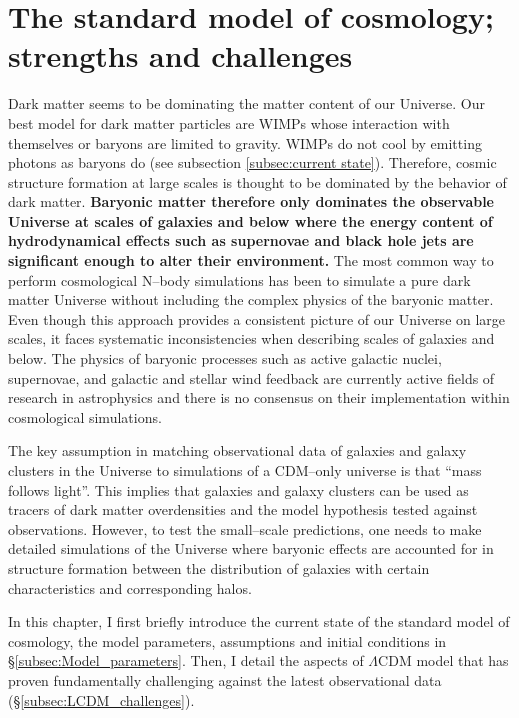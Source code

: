 \documentclass[a4wide,12pt]{book}
\begin{document}
{\begin{itemize}
  \end{itemize}


\chapter{The standard model of cosmology; strengths and challenges}
\label{sec:LCDM}
Dark matter seems to be dominating the matter content of our Universe. Our best model for dark matter particles are WIMPs whose interaction with themselves or baryons are limited to gravity.  WIMPs do not cool by emitting photons as baryons do (see subsection \ref{subsec:current state}). Therefore, cosmic structure formation at large scales is thought to be dominated by the behavior of dark matter. {\bf Baryonic matter therefore only dominates the observable Universe at scales of galaxies and below where the energy content of hydrodynamical effects such as supernovae and black hole jets are significant enough to alter their environment.} The most common way to perform cosmological N--body simulations has been to simulate a pure dark matter Universe without including the complex physics of the baryonic matter.  Even though this approach provides a consistent picture of our Universe on large scales, it faces systematic inconsistencies when describing scales of galaxies and below. The physics of baryonic processes such as active galactic nuclei, supernovae, and galactic and stellar wind feedback are currently active fields of research in astrophysics and there is no consensus on their implementation within cosmological simulations. 

The key assumption in matching observational data of galaxies and galaxy clusters in the Universe to simulations of a CDM--only universe is that ``mass follows light''. This implies that galaxies and galaxy clusters can be used as tracers of dark matter overdensities and the model hypothesis tested against observations. However, to test the small--scale predictions, one needs to make detailed simulations of the Universe where baryonic effects are accounted for in structure formation  between the distribution of galaxies with certain characteristics and corresponding halos.

In this chapter, I first briefly introduce the current state of the standard model of cosmology, the model parameters, assumptions and initial conditions in  \S \ref{subsec:Model_parameters}. Then, I detail the aspects of $\Lambda$CDM model that has proven fundamentally challenging against the latest observational data (\S \ref{subsec:LCDM_challenges}).

}
\end{document}
